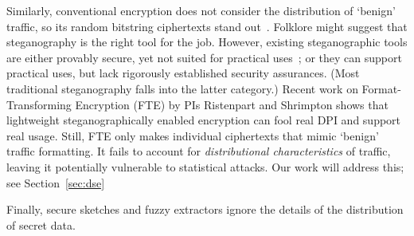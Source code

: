 {Similarly, conventional encryption does not consider the distribution
of `benign' traffic, so its random bitstring ciphertexts stand
out~\cite{KBMP13}.  Folklore might suggest that steganography 
is the right tool for the job.  However, existing
steganographic tools are either provably secure, yet not suited for
practical uses~\cite{Hopper:Provable_Stego}; or they can support
practical uses, but lack rigorously established security
assurances. (Most traditional steganography falls into the latter category.)
Recent work on Format-Transforming Encryption (FTE) by PIs Ristenpart
and Shrimpton shows that lightweight steganographically enabled
encryption can fool real DPI and support real usage.  Still, FTE only makes
{individual} ciphertexts that mimic `benign' traffic formatting.  
It fails to account for \textit{distributional characteristics} of
traffic, leaving it potentially vulnerable to statistical attacks.  
Our work will address this; see Section~\ref{sec:dse}


Finally, secure
sketches and fuzzy extractors ignore the details of the distribution of secret
data. 


\fi

}
